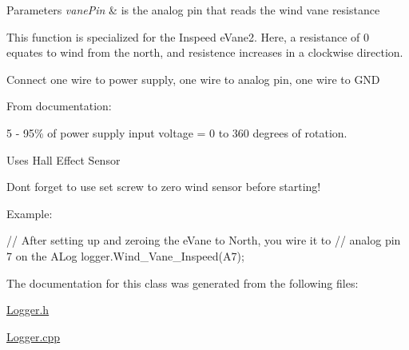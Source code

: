 \begin{DoxyParams}{Parameters}
{\em vane\+Pin} & is the analog pin that reads the wind vane resistance\\
\hline
\end{DoxyParams}
This function is specialized for the Inspeed e\+Vane2. Here, a resistance of 0 equates to wind from the north, and resistence increases in a clockwise direction.

Connect one wire to power supply, one wire to analog pin, one wire to G\+ND

From documentation\+:
\begin{DoxyItemize}
\item 5 -\/ 95\% of power supply input voltage = 0 to 360 degrees of rotation.
\item Uses Hall Effect Sensor
\item Don\textquotesingle{}t forget to use set screw to zero wind sensor before starting!
\end{DoxyItemize}

Example\+: 
\begin{DoxyCode}
\textcolor{comment}{// After setting up and zeroing the eVane to North, you wire it to }
\textcolor{comment}{// analog pin 7 on the ALog}
logger.Wind\_Vane\_Inspeed(A7);
\end{DoxyCode}


The documentation for this class was generated from the following files\+:\begin{DoxyCompactItemize}
\item 
\hyperlink{Logger_8h}{Logger.\+h}\item 
\hyperlink{Logger_8cpp}{Logger.\+cpp}\end{DoxyCompactItemize}
